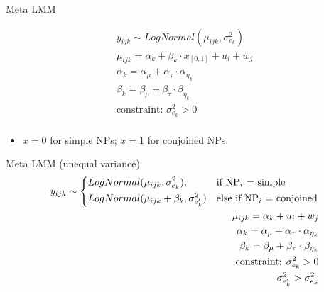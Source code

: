 \begin{frame}[fragile]{Meta LMM}
			
	\begin{equation*}
		\begin{aligned}	
			y_{ijk} \sim LogNormal(\mu_{ijk}, \sigma_{e_k}^2)\\
			\mu_{ijk} = \alpha_k + \beta_k \cdot x_{[0,1]} + u_i + w_j\\
			\alpha_k = \alpha_{\mu} + \alpha_{\tau} \cdot \alpha_{\eta_k}\\
			\beta_k = \beta_{\mu} + \beta_{\tau} \cdot \beta_{\eta_k}\\
			\text{constraint: }\sigma_{e_k}^2>0\\
		\end{aligned}	
	\end{equation*}		
	\begin{small}	
		\begin{itemize}
			\item $x=0$ for simple NPs; $x=1$ for conjoined NPs.
		\end{itemize}
	\end{small}
	
\end{frame}

\begin{frame}[fragile]{Meta LMM (unequal variance)}
	\begin{equation*}
		\begin{aligned}
			y_{ijk} \sim
			\begin{dcases*} 
				LogNormal(\mu_{ijk}, \sigma_{e_k}^2), &  if NP$_{i}$ = simple\\
				LogNormal(\mu_{ijk} + \beta_k, \sigma_{e'_k}^2) & else if NP$_{i}$ = conjoined\\
			\end{dcases*}\\
			\mu_{ijk} = \alpha_k + u_i + w_j\\
			\alpha_k = \alpha_{\mu} + \alpha_{\tau} \cdot \alpha_{\eta_k}\\
			\beta_k = \beta_{\mu} + \beta_{\tau} \cdot \beta_{\eta_k}\\
			\text{constraint: }\sigma_{e_k}^2>0\\
			\sigma_{e'_k}^2 > \sigma_{e_k}^2
		\end{aligned}
	\end{equation*}

\end{frame}


